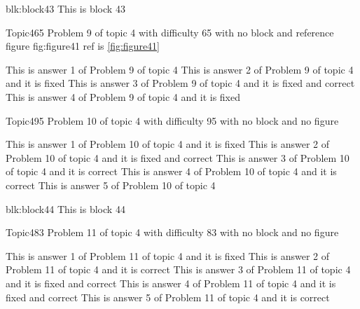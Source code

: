 \documentclass[master]{exam}
\begin{document}
\begin{block}{blk:block43}
This is block 43
\end{block}


\begin{problem}{Topic4}{65}
	Problem 9 of topic 4 with difficulty 65 with no block and reference figure fig:figure41 ref is \ref{fig:figure41}
	\begin{answers}
		\answer This is answer 1 of Problem 9 of topic 4 
		\answer[fixed] This is answer 2 of Problem 9 of topic 4 and it is fixed
		 This is answer 3 of Problem 9 of topic 4 and it is fixed and correct
		\answer[fixed] This is answer 4 of Problem 9 of topic 4 and it is fixed
	\end{answers}
\end{problem}

\begin{problem}{Topic4}{95}
	Problem 10 of topic 4 with difficulty 95 with no block and no figure
	\begin{answers}
		\answer[fixed] This is answer 1 of Problem 10 of topic 4 and it is fixed
		 This is answer 2 of Problem 10 of topic 4 and it is fixed and correct
		\answer[correct] This is answer 3 of Problem 10 of topic 4 and it is correct
		\answer[correct] This is answer 4 of Problem 10 of topic 4 and it is correct
		\answer This is answer 5 of Problem 10 of topic 4 
	\end{answers}
\end{problem}



\begin{block}{blk:block44}
This is block 44
\end{block}


\begin{problem}{Topic4}{83}
	Problem 11 of topic 4 with difficulty 83 with no block and no figure
	\begin{answers}
		\answer[fixed] This is answer 1 of Problem 11 of topic 4 and it is fixed
		\answer[correct] This is answer 2 of Problem 11 of topic 4 and it is correct
		 This is answer 3 of Problem 11 of topic 4 and it is fixed and correct
		 This is answer 4 of Problem 11 of topic 4 and it is fixed and correct
		\answer[correct] This is answer 5 of Problem 11 of topic 4 and it is correct
	\end{answers}
\end{problem}
\end{document}
